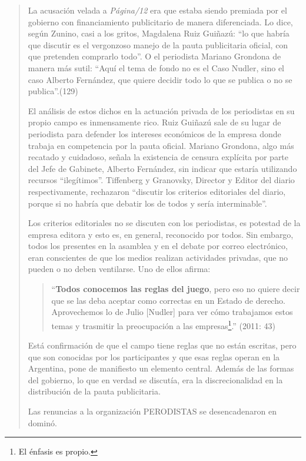 \begin{quote}
La acusación velada a \emph{Página/12} era que estaba siendo premiada por el gobierno con financiamiento publicitario de manera diferenciada. Lo dice, según Zunino, casi a los gritos, Magdalena Ruiz Guiñazú: \enquote{lo que habría que discutir es el vergonzoso manejo de la pauta publicitaria oficial, con que pretenden comprarlo todo}. O el periodista Mariano Grondona de manera más sutil: \enquote{Aquí el tema de fondo no es el Caso Nudler, sino el caso Alberto Fernández, que quiere decidir todo lo que se publica o no se publica}.(129)

El análisis de estos dichos en la actuación privada de los periodistas en su propio campo es inmensamente rico. Ruiz Guiñazú sale de su lugar de periodista para defender los intereses económicos de la empresa donde trabaja en competencia por la pauta oficial. Mariano Grondona, algo más recatado y cuidadoso, señala la existencia de censura explícita por parte del Jefe de Gabinete, Alberto Fernández, sin indicar que estaría utilizando recursos ``ilegítimos''. Tiffenberg y Granovsky, Director y Editor del diario respectivamente, rechazaron ``discutir los criterios editoriales del diario, porque si no habría que debatir los de todos y sería interminable''.

Los criterios editoriales no se discuten con los periodistas, es potestad de la empresa editora y esto es, en general, reconocido por todos. Sin embargo, todos los presentes en la asamblea y en el debate por correo electrónico, eran conscientes de que los medios realizan actividades privadas, que no pueden o no deben ventilarse. Uno de ellos afirma:

\begin{quote}
	\enquote{\textbf{Todos conocemos las reglas del juego}, pero eso no quiere decir que se las deba aceptar como correctas en un Estado de derecho. Aprovechemos lo de Julio {[}Nudler{]} para ver cómo trabajamos estos temas y trasmitir la preocupación a las empresas\footnote{El énfasis es propio.}.} (2011: 43)
\end{quote}


Está confirmación de que el campo tiene reglas que no están escritas, pero que son conocidas por los participantes y que esas reglas operan en la Argentina, pone de manifiesto un elemento central. Además de las formas del gobierno, lo que en verdad se discutía, era la discrecionalidad en la distribución de la pauta publicitaria.

Las renuncias a la organización PERODISTAS se desencadenaron en dominó.


\end{quote}
